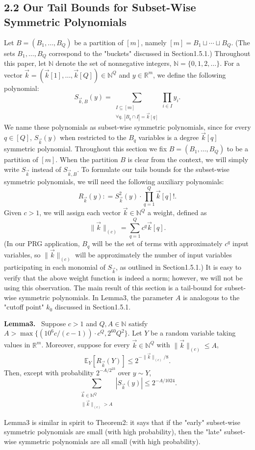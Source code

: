 \documentclass[10pt,a4paper]{article}
\newenvironment{authorclaim}[1]{\par\medskip\noindent\textbf{#1.}\ \ignorespaces}{\par\medskip}
\begin{document}
\subsection*{2.2 Our Tail Bounds for Subset-Wise Symmetric Polynomials}
Let $B=(B_1,\ldots,B_Q)$ be a partition of $[m]$, namely $[m]=B_1\sqcup\cdots\sqcup B_Q$. (The sets $B_1,\ldots,B_Q$ correspond to the "buckets" discussed in Section1.5.1.) Throughout this paper, let $\mathbb N$ denote the set of nonnegative integers, $\mathbb N=\{0,1,2,\ldots\}$. For a vector $\vec k=(\vec k[1],\ldots,\vec k[Q])\in\mathbb N^Q$ and $y\in\mathbb R^m$, we define the following polynomial:
\[
S_{\vec k,B}(y)=\sum_{\substack{I\subseteq[m]\\\forall q,\ |B_q\cap I|=\vec k[q]}}\prod_{i\in I}y_i.
\]
We name these polynomials as subset-wise symmetric polynomials, since for every $q\in[Q]$, $S_{\vec k}(y)$ when restricted to the $B_q$ variables is a degree $\vec k[q]$ symmetric polynomial.
Throughout this section we fix $B=(B_1,\ldots,B_Q)$ to be a partition of $[m]$. When the partition $B$ is clear from the context, we will simply write $S_{\vec k}$ instead of $S_{\vec k,B}$. To formulate our tails bounds for the subset-wise symmetric polynomials, we will need the following auxiliary polynomials:
\[
R_{\vec k}(y)\mathrel{\mathop:}=S_{\vec k}^2(y)\cdot\prod_{q=1}^Q\vec k[q]!.
\]
Given $c>1$, we will assign each vector $\vec k\in\mathbb N^Q$ a weight, defined as
\[
\|\vec k\|_{(c)}=\sum_{q=1}^Qc^q\vec k[q].
\]
(In our PRG application, $B_q$ will be the set of terms with approximately $c^q$ input variables, so $\|\vec k\|_{(c)}$ will be approximately the number of input variables participating in each monomial of $S_{\vec k}$, as outlined in Section1.5.1.) It is easy to verify that the above weight function is indeed a norm; however, we will not be using this observation.
The main result of this section is a tail-bound for subset-wise symmetric polynomials. In Lemma3, the parameter $A$ is analogous to the "cutoff point" $k_0$ discussed in Section1.5.1.
\begin{authorclaim}{Lemma3}
Suppose $c>1$ and $Q,A\in\mathbb N$ satisfy $A>\max\{(10^6c/(c-1))\cdot c^Q,2^{60}Q^2\}$. Let $Y$ be a random variable taking values in $\mathbb R^m$. Moreover, suppose for every $\vec k\in\mathbb N^Q$ with $\|\vec k\|_{(c)}\le A$,
\[
\mathbb E_Y[R_{\vec k}(Y)]\le2^{-\|\vec k\|_{(c)}/8}.
\]
Then, except with probability $2^{-A/2^{23}}$ over $y\sim Y$,
\[
\sum_{\substack{\vec k\in\mathbb N^Q\\\|\vec k\|_{(c)}>A}}|S_{\vec k}(y)|\le2^{-A/1024}.
\]
\end{authorclaim}
Lemma3 is similar in spirit to Theorem2: it says that if the "early" subset-wise symmetric polynomials are small (with high probability), then the "late" subset-wise symmetric polynomials are all small (with high probability).
\end{document}
